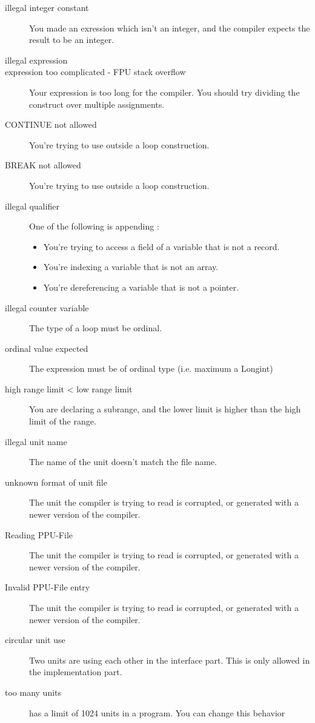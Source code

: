 \documentclass{report}
\begin{document}
\begin{description}
\item [illegal integer constant]
You made an exression which isn't an integer, and the compiler expects the
result to be an integer.
\item [illegal expression]
\item [expression too complicated - FPU stack overflow]
Your expression is too long for the compiler. You should try dividing the
construct over multiple assignments.
\item [CONTINUE not allowed]
You're trying to use  outside a loop construction.
\item [BREAK not allowed]
You're trying to use  outside a loop construction.
\item [illegal qualifier]
One of the following is appending :
\begin{itemize}
\item You're trying to access a field of a variable that is not a record.
\item You're indexing a variable that is not an array.
\item You're dereferencing a variable that is not a pointer. 
\end{itemize}
\item [illegal counter variable]
The type of a  loop must be ordinal.
\item [ordinal value expected]
The expression must be of ordinal type (i.e. maximum a Longint)
\item [high range limit < low range limit]
You are declaring a subrange, and the lower limit is higher than the high
limit of the range.
\item [illegal unit name]
The name of the unit doesn't match the file name.
\item [unknown format of unit file]
The unit the compiler is trying to read is corrupted, or generated with a
newer version of the compiler.
\item [Reading PPU-File]
The unit the compiler is trying to read is corrupted, or generated with a
newer version of the compiler.
\item [Invalid PPU-File entry]
The unit the compiler is trying to read is corrupted, or generated with a
newer version of the compiler.
\item [circular unit use]
Two units are using each other in the interface part. This is only allowed
in the implementation part.
\item [too many units]
\fpc has a limit of 1024 units in a program. You can change this behavior

\end{description}
\end{document}
